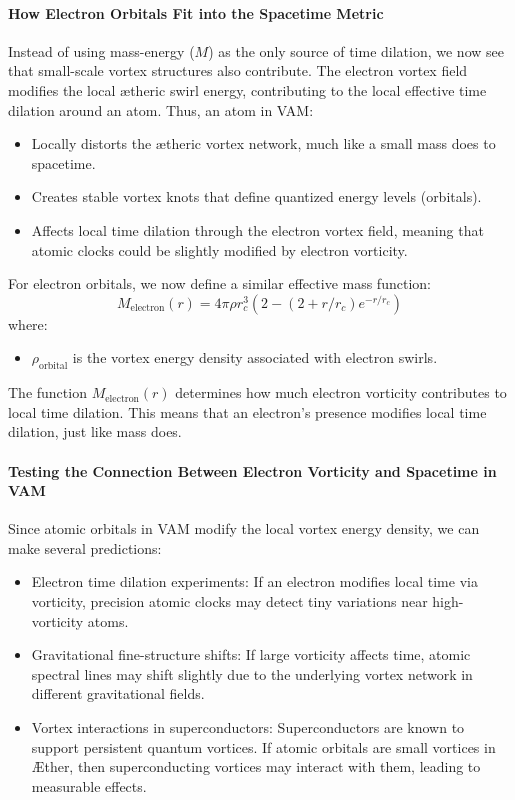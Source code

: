 \documentclass[a4paper,10pt]{article}
\begin{document}
\paragraph{How Electron Orbitals Fit into the Spacetime Metric}
Instead of using mass-energy ($M$) as the only source of time dilation, we now see that small-scale vortex structures also contribute.
The electron vortex field modifies the local ætheric swirl energy, contributing to the local effective time dilation around an atom.
Thus, an atom in VAM:
\begin{itemize}
    \item Locally distorts the ætheric vortex network, much like a small mass does to spacetime.
    \item Creates stable vortex knots that define quantized energy levels (orbitals).
    \item Affects local time dilation through the electron vortex field, meaning that atomic clocks could be slightly modified by electron vorticity.
\end{itemize}
For electron orbitals, we now define a similar effective mass function:
\begin{equation*}
    M_\text{electron}(r)=4 \pi \rho r_c^3  \left( 2 - (2 + r/r_c) e^{-r / r_c} \right)
\end{equation*}
where:
\begin{itemize}
    \item $\rho_\text{orbital}$ is the vortex energy density associated with electron swirls.
\end{itemize}
The function $M_\text{electron}(r)$ determines how much electron vorticity contributes to local time dilation.
This means that an electron's presence modifies local time dilation, just like mass does.

\paragraph{Testing the Connection Between Electron Vorticity and Spacetime in VAM}
Since atomic orbitals in VAM modify the local vortex energy density, we can make several predictions:
\begin{itemize}
    \item Electron time dilation experiments: If an electron modifies local time via vorticity, precision atomic clocks may detect tiny variations near high-vorticity atoms.
    \item Gravitational fine-structure shifts: If large vorticity affects time, atomic spectral lines may shift slightly due to the underlying vortex network in different gravitational fields.
    \item Vortex interactions in superconductors: Superconductors are known to support persistent quantum vortices. If atomic orbitals are small vortices in Æther, then superconducting vortices may interact with them, leading to measurable effects.
\end{itemize}
\end{document}
